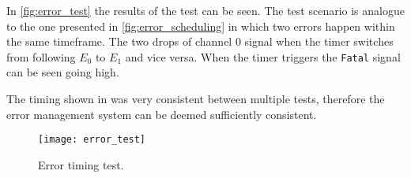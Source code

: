 In \autoref{fig:error_test} the results of the test can be seen. The test scenario is analogue to the one presented in \autoref{fig:error_scheduling} in which two errors happen within the same timeframe. The two drops of channel 0 signal when the timer switches from following $E_0$ to $E_1$ and vice versa.
When the timer triggers the \texttt{Fatal} signal can be seen going high.

The timing shown in was very consistent between multiple tests, therefore the error management system can be deemed sufficiently consistent.
\begin{figure}[h]
	\centering
	\texttt{[image: error\_test]}
	\caption{Error timing test.}
	\label{fig:error_test}
\end{figure}
\newpage

